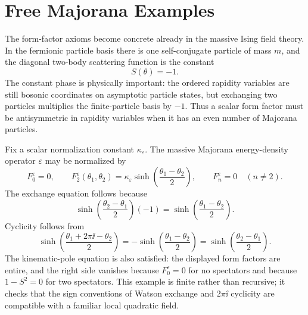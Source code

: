 \section{Free Majorana Examples}

The form-factor axioms become concrete already in the massive Ising field
theory.  In the fermionic particle basis there is one self-conjugate particle
of mass \(m\), and the diagonal two-body scattering function is the constant
\[
  S(\theta)=-1 .
\]
The constant phase is physically important: the ordered rapidity variables
are still bosonic coordinates on asymptotic particle states, but exchanging
two particles multiplies the finite-particle basis by \(-1\).  Thus a scalar
form factor must be antisymmetric in rapidity variables when it has an even
number of Majorana particles.

\begin{example}
\label{ex:free-majorana-energy-form-factor}
Fix a scalar normalization constant \(\kappa_{\varepsilon}\).  The massive
Majorana energy-density operator \(\varepsilon\) may be normalized by
\[
  F_0^\varepsilon=0,\qquad
  F_2^\varepsilon(\theta_1,\theta_2)
  =
  \kappa_{\varepsilon}
  \sinh\!\left(\frac{\theta_1-\theta_2}{2}\right),
  \qquad
  F_n^\varepsilon=0\quad(n\neq2).
\]
The exchange equation follows because
\[
  \sinh\!\left(\frac{\theta_2-\theta_1}{2}\right)(-1)
  =
  \sinh\!\left(\frac{\theta_1-\theta_2}{2}\right).
\]
Cyclicity follows from
\[
  \sinh\!\left(\frac{\theta_1+2\pi\ii-\theta_2}{2}\right)
  =
  -\sinh\!\left(\frac{\theta_1-\theta_2}{2}\right)
  =
  \sinh\!\left(\frac{\theta_2-\theta_1}{2}\right).
\]
The kinematic-pole equation is also satisfied: the displayed form factors
are entire, and the right side vanishes because \(F_0^\varepsilon=0\) for no
spectators and because \(1-S^2=0\) for two spectators.  This example is
finite rather than recursive; it checks that the sign conventions of Watson
exchange and \(2\pi\ii\) cyclicity are compatible with a familiar local
quadratic field.
\end{example}

